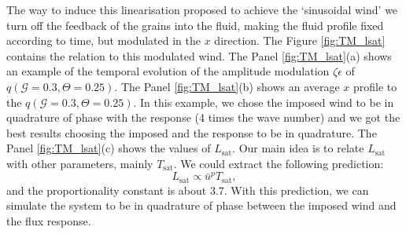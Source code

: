     The way to induce this linearisation proposed to achieve the `sinusoidal wind' we turn off the feedback of the grains into the fluid, making the fluid profile fixed according to time, but modulated in the $x$ direction. The Figure \ref{fig:TM_lsat} contains the relation to this modulated wind. The Panel \ref{fig:TM_lsat}(a) shows an example of the temporal evolution of the amplitude modulation $\zeta \epsilon$ of $q(\mathcal{G=0.3},\Theta=0.25)$. The Panel \ref{fig:TM_lsat}(b) shows an average $x$ profile to the $q(\mathcal{G=0.3},\Theta=0.25)$. In this example, we chose the imposed wind to be in quadrature of phase with the response (4 times the wave number) and we got the best results choosing the imposed and the response to be in quadrature. The Panel \ref{fig:TM_lsat}(c) shows the values of $L_\textrm{sat}$. Our main idea is to relate $L_\textrm{sat}$ with other parameters, mainly $T_\textrm{sat}$. We could extract the following prediction:
\begin{equation}
    L_\textrm{sat} \propto \bar{u}^p T_\textrm{sat},
\end{equation}
and the proportionality constant is about 3.7. With this prediction, we can simulate the system to be in quadrature of phase between the imposed wind and the flux response.

